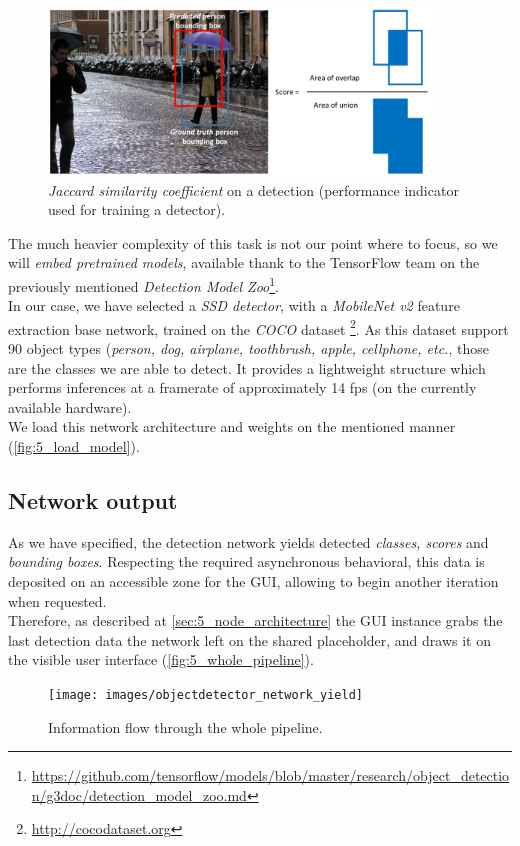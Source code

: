 		\begin{figure}[h!]
			\centering
			\includegraphics[width=4in]{images/detection_iou}
			\caption{\emph{Jaccard similarity coefficient} on a detection (performance indicator used for training a detector).}
			\label{fig:5_iou}
		\end{figure}
	
		The much heavier complexity of this task is not our point where to focus, so we will \emph{embed pretrained models}, available thank to the TensorFlow team on the previously mentioned \emph{Detection Model Zoo}\footnote{\url{https://github.com/tensorflow/models/blob/master/research/object_detection/g3doc/detection_model_zoo.md}}.\\
		
		In our case, we have selected a \emph{SSD detector}, with a \emph{MobileNet v2} feature extraction base network, trained on the \emph{COCO} dataset \footnote{\url{http://cocodataset.org}}. As this dataset support 90 object types (\emph{person, dog, airplane, toothbrush, apple, cellphone, etc.}, those are the classes we are able to detect. It provides a lightweight structure which performs inferences at a framerate of approximately 14 fps (on the currently available hardware).\\
		
		We load this network architecture and weights on the mentioned manner (\autoref{fig:5_load_model}). 
	
	
	\subsection{Network output}
		As we have specified, the detection network yields detected \emph{classes, scores} and \emph{bounding boxes}. Respecting the required asynchronous behavioral, this data is deposited on an accessible zone for the GUI, allowing to begin another iteration when requested.\\
		
		Therefore, as described at \autoref{sec:5_node_architecture} the GUI instance grabs the last detection data the network left on the shared placeholder, and draws it on the visible user interface (\autoref{fig:5_whole_pipeline}).
		
		\begin{figure}[h]
			\centering
			\texttt{[image: images/objectdetector\_network\_yield]}
			\caption{Information flow through the whole pipeline.}
			\label{fig:5_whole_pipeline}
		\end{figure}
	
	
	
	
	
	
	
	
	
	
	
	
	
	
	
	
	
	
	